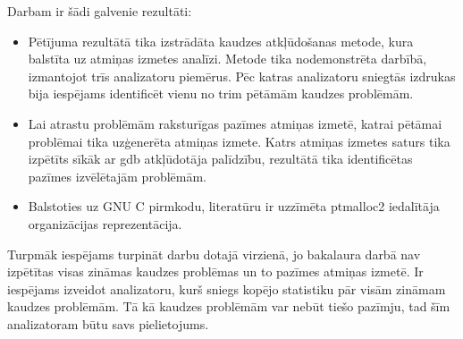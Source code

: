 ﻿Darbam ir šādi galvenie rezultāti:
\begin{itemize}
    \item Pētījuma rezultātā tika izstrādāta kaudzes atkļūdošanas metode, kura balstīta uz atmiņas izmetes analīzi.
    Metode tika nodemonstrēta darbībā, izmantojot trīs analizatoru piemērus.
    Pēc katras analizatoru sniegtās izdrukas bija iespējams identificēt vienu no trim pētāmām kaudzes problēmām.
    \item Lai atrastu problēmām raksturīgas pazīmes atmiņas izmetē, katrai pētāmai problēmai tika uzģenerēta atmiņas izmete.
    Katrs atmiņas izmetes saturs tika izpētīts sīkāk ar gdb atkļūdotāja palīdzību, rezultātā tika identificētas pazīmes izvēlētajām problēmām.
    \item Balstoties uz GNU C pirmkodu, literatūru ir uzzīmēta ptmalloc2 iedalītāja organizācijas reprezentācija.
\end{itemize}

Turpmāk iespējams turpināt darbu dotajā virzienā, jo bakalaura darbā nav izpētītas visas zināmas kaudzes problēmas un to pazīmes atmiņas izmetē.
Ir iespējams izveidot analizatoru, kurš sniegs kopējo statistiku pār visām zināmam kaudzes problēmām. 
Tā kā kaudzes problēmām var nebūt tiešo pazīmju, tad šīm analizatoram būtu savs pielietojums.
